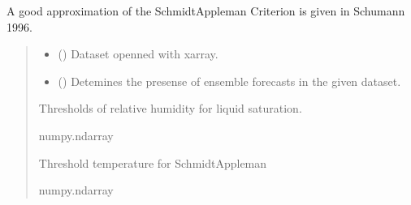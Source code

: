\documentclass[a4paper,11pt,english]{sphinxmanual}
\begin{document}
\begin{fulllineitems}
\label{\detokenize{modules:envlib.contrail.get_cont_form_thr}}
\pysigstartsignatures
{}
\pysigstopsignatures\begin{description}
\sphinxAtStartPar
A good approximation of the Schmidt\sphinxhyphen{}Appleman Criterion is given in Schumann 1996.

\end{description}
\begin{quote}\begin{description}
\begin{itemize}
\item {} 
\sphinxAtStartPar
{} () \textendash{} Dataset openned with xarray.

\item {} 
\sphinxAtStartPar
{} () \textendash{} Detemines the presense of ensemble forecasts in the given dataset.

\end{itemize}

\sphinxAtStartPar
Thresholds of relative humidity for liquid saturation.

\sphinxAtStartPar
numpy.ndarray

\sphinxAtStartPar
Threshold temperature for Schmidt\sphinxhyphen{}Appleman

\sphinxAtStartPar
numpy.ndarray

\end{description}\end{quote}

\end{fulllineitems}

\end{document}
